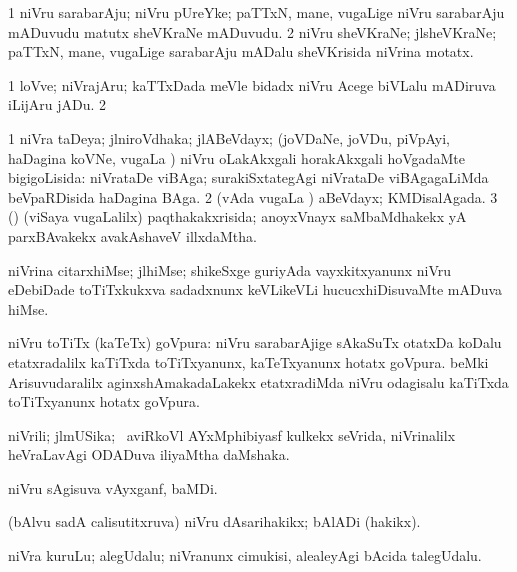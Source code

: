 {\bentry
{} 
\gl{\nA}
\expl{}
\bmng
\bnum
\num{1} niVru sarabarAju; niVru pUreYke; paTTxN, mane, \mo vugaLige niVru sarabarAju mADuvudu matutx sheVKraNe mADuvudu. 
\num{2} niVru sheVKraNe; jlsheVKraNe; paTTxN, mane, \mo vugaLige sarabarAju mADalu sheVKrisida niVrina motatx. 
\enum
\emng
\eentry

\bentry
{} 
\gl{\nA}
\expl{}
\bmng
\bnum
\num{1} loVve; niVrajAru; kaTTxDada meVle bidadx niVru Acege biVLalu mADiruva iLijAru jADu. 
\num{2}  
\enum
\emng
\eentry

\bentry
{} 
\gl{\gu}
\expl{}
\bmng
\bnum
\num{1} niVra taDeya; jlniroVdhaka; jlABeVdayx; (joVDaNe, joVDu, piVpAyi, haDagina koVNe, \mo vugaLa \vi) niVru oLakAkxgali horakAkxgali hoVgadaMte bigigoLisida:  niVrataDe viBAga; surakiSxtategAgi niVrataDe viBAgagaLiMda beVpaRDisida haDagina BAga. 
\num{2} (vAda \mo vugaLa \vi) aBeVdayx; KMDisalAgada. 
\num{3} (\rUpa) (viSaya \mo vugaLalilx) paqthakakxrisida; anoyxVnayx saMbaMdhakekx yA parxBAvakekx avakAshaveV illxdaMtha. 
\enum
\emng
\eentry

\bentry
{} 
\gl{\nA}
\expl{}
\bmng
niVrina citarxhiMse; jlhiMse; shikeSxge guriyAda vayxkitxyanunx niVru eDebiDade toTiTxkukxva sadadxnunx keVLikeVLi hucucxhiDisuvaMte mADuva hiMse. 
\emng
\eentry

\bentry
{} 
\gl{\nA}
\expl{}
\bmng
niVru toTiTx (kaTeTx) goVpura: 
\banum
{} niVru sarabarAjige sAkaSuTx otatxDa koDalu etatxradalilx kaTiTxda toTiTxyanunx, kaTeTxyanunx hotatx goVpura. 
 beMki Arisuvudaralilx aginxshAmakadaLakekx etatxradiMda niVru odagisalu kaTiTxda toTiTxyanunx hotatx goVpura. 
\eanum
\emng
\eentry

\bentry
{} 
\gl{\nA}
\expl{}
\bmng
niVrili; jlmUSika; \kanmu\ aviRkoVl AYxMphibiyasf kulkekx seVrida, niVrinalilx heVraLavAgi ODADuva iliyaMtha daMshaka. 
\emng
\eentry

\bentry
{} 
\gl{\nA}
\expl{}
\bmng
niVru sAgisuva vAyxganf, baMDi. 
\emng
\eentry

\bentry
{} 
\gl{\nA}
\expl{}
\bmng
(bAlvu sadA calisutitxruva) niVru dAsarihakikx; bAlADi (hakikx). 
\emng
\eentry

\bentry
{} 
\gl{\nA}
\expl{}
\bmng
niVra kuruLu; alegUdalu; niVranunx cimukisi, alealeyAgi bAcida talegUdalu. 
\emng
\eentry

}

